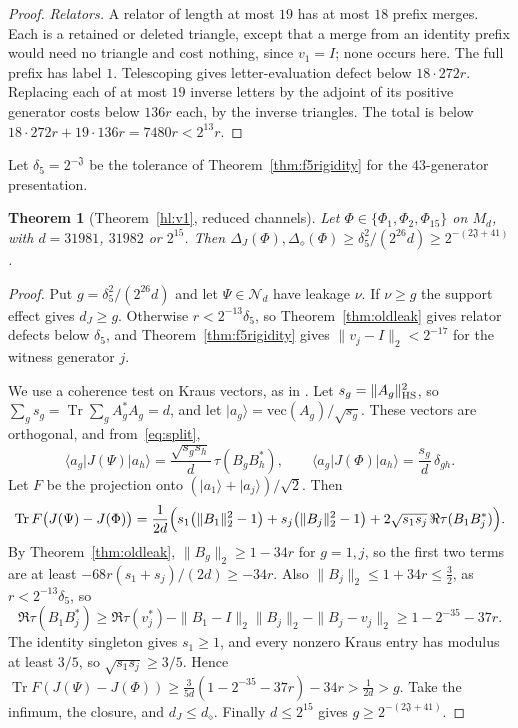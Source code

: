 \documentclass[11pt]{article}
\newtheorem{theorem}{Theorem}[section]
\newcommand{\Tr}{\operatorname{Tr}}
\newcommand{\N}{\mathcal N}
\newcommand{\cJ}{\mathfrak J}
\newcommand{\ket}[1]{\lvert #1\rangle}
\newcommand{\bra}[1]{\langle #1\rvert}
\begin{document}
\begin{proof}
\emph{Relators.}  A relator of length at most $19$ has at most $18$ prefix merges.  Each is a retained or deleted triangle, except that a merge from an identity prefix would need no triangle and cost nothing, since $v_1=I$; none occurs here.  The full prefix has label $1$.  Telescoping gives letter-evaluation defect below $18\cdot272r$.  Replacing each of at most $19$ inverse letters by the adjoint of its positive generator costs below $136r$ each, by the inverse triangles.  The total is below $18\cdot272r+19\cdot136r=7480r<2^{13}r$.
\end{proof}

Let $\delta_5=2^{-\cJ}$ be the tolerance of Theorem~\ref{thm:f5rigidity} for the $43$-generator presentation.

\begin{theorem}[Theorem~\ref{hl:v1}, reduced channels]\label{thm:oldglobal}
Let $\Phi\in\{\Phi_1,\Phi_2,\Phi_{15}\}$ on $M_d$, with $d=31981$, $31982$ or $2^{15}$.  Then $\Delta_J(\Phi),\Delta_\diamond(\Phi)\ge\delta_5^2/(2^{26}d)\ge2^{-(2\cJ+41)}$.
\end{theorem}
\begin{proof}
Put $g=\delta_5^2/(2^{26}d)$ and let $\Psi\in\N_d$ have leakage $\nu$.  If $\nu\ge g$ the support effect gives $d_J\ge g$.  Otherwise $r<2^{-13}\delta_5$, so Theorem~\ref{thm:oldleak} gives relator defects below $\delta_5$, and Theorem~\ref{thm:f5rigidity} gives $\|v_j-I\|_2<2^{-17}$ for the witness generator $j$.

We use a coherence test on Kraus vectors, as in \cite[Theorem~5]{MghirbiDouglasV1}.  Let $s_g=\|A_g\|_{\rm HS}^2$, so $\sum_gs_g=\Tr\sum_gA_g^*A_g=d$, and let $\ket{a_g}=\mathrm{vec}(A_g)/\sqrt{s_g}$.  These vectors are orthogonal, and from~\eqref{eq:split},
\[
 \bra{a_g}J(\Psi)\ket{a_h}=\frac{\sqrt{s_gs_h}}d\,\tau(B_gB_h^*),\qquad \bra{a_g}J(\Phi)\ket{a_h}=\frac{s_g}d\,\delta_{gh}.
\]
Let $F$ be the projection onto $(\ket{a_1}+\ket{a_j})/\sqrt2$.  Then
\[
 \Tr F\bigl(J(\Psi)-J(\Phi)\bigr)=\frac1{2d}\Bigl(s_1\bigl(\|B_1\|_2^2-1\bigr)+s_j\bigl(\|B_j\|_2^2-1\bigr)+2\sqrt{s_1s_j}\,\Re\tau(B_1B_j^*)\Bigr).
\]
By Theorem~\ref{thm:oldleak}, $\|B_g\|_2\ge1-34r$ for $g=1,j$, so the first two terms are at least $-68r(s_1+s_j)/(2d)\ge-34r$.  Also $\|B_j\|_2\le1+34r\le\tfrac32$, as $r<2^{-13}\delta_5$, so
\[
 \Re\tau(B_1B_j^*)\ge\Re\tau(v_j^*)-\|B_1-I\|_2\|B_j\|_2-\|B_j-v_j\|_2\ge1-2^{-35}-37r.
\]
The identity singleton gives $s_1\ge1$, and every nonzero Kraus entry has modulus at least $3/5$, so $\sqrt{s_1s_j}\ge3/5$.  Hence $\Tr F(J(\Psi)-J(\Phi))\ge\frac3{5d}(1-2^{-35}-37r)-34r>\frac1{2d}>g$.  Take the infimum, the closure, and $d_J\le d_\diamond$.  Finally $d\le2^{15}$ gives $g\ge2^{-(2\cJ+41)}$.
\end{proof}
\end{document}
